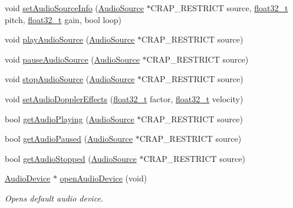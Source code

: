 \begin{DoxyCompactItemize}
\item 
void \hyperlink{namespacecrap_a4fd4860c7cb595ae4678703680d45f56}{set\+Audio\+Source\+Info} (\hyperlink{namespacecrap_a462d678db37c6a434145136ab6d59720}{Audio\+Source} $\ast$C\+R\+A\+P\+\_\+\+R\+E\+S\+T\+R\+I\+C\+T source, \hyperlink{crap__types_8h_a4611b605e45ab401f02cab15c5e38715}{float32\+\_\+t} pitch, \hyperlink{crap__types_8h_a4611b605e45ab401f02cab15c5e38715}{float32\+\_\+t} gain, bool loop)
\item 
void \hyperlink{namespacecrap_a4c9e443f838fdaa672cdac9a99c476c8}{play\+Audio\+Source} (\hyperlink{namespacecrap_a462d678db37c6a434145136ab6d59720}{Audio\+Source} $\ast$C\+R\+A\+P\+\_\+\+R\+E\+S\+T\+R\+I\+C\+T source)
\item 
void \hyperlink{namespacecrap_ae71e126c8b6319ea607fb4af874c15cf}{pause\+Audio\+Source} (\hyperlink{namespacecrap_a462d678db37c6a434145136ab6d59720}{Audio\+Source} $\ast$C\+R\+A\+P\+\_\+\+R\+E\+S\+T\+R\+I\+C\+T source)
\item 
void \hyperlink{namespacecrap_afe2ccaeafe2283bb11626085358de2ae}{stop\+Audio\+Source} (\hyperlink{namespacecrap_a462d678db37c6a434145136ab6d59720}{Audio\+Source} $\ast$C\+R\+A\+P\+\_\+\+R\+E\+S\+T\+R\+I\+C\+T source)
\item 
void \hyperlink{namespacecrap_abc5f005100a0bcf817e82185e209d517}{set\+Audio\+Doppler\+Effects} (\hyperlink{crap__types_8h_a4611b605e45ab401f02cab15c5e38715}{float32\+\_\+t} factor, \hyperlink{crap__types_8h_a4611b605e45ab401f02cab15c5e38715}{float32\+\_\+t} velocity)
\item 
bool \hyperlink{namespacecrap_ae366287c041ff6585d2ebde0ab651e9a}{get\+Audio\+Playing} (\hyperlink{namespacecrap_a462d678db37c6a434145136ab6d59720}{Audio\+Source} $\ast$C\+R\+A\+P\+\_\+\+R\+E\+S\+T\+R\+I\+C\+T source)
\item 
bool \hyperlink{namespacecrap_a72daa9c46c46112bc58eec039ccbe06b}{get\+Audio\+Paused} (\hyperlink{namespacecrap_a462d678db37c6a434145136ab6d59720}{Audio\+Source} $\ast$C\+R\+A\+P\+\_\+\+R\+E\+S\+T\+R\+I\+C\+T source)
\item 
bool \hyperlink{namespacecrap_aaad4e9a7f362dff5b1150fef391fcdea}{get\+Audio\+Stopped} (\hyperlink{namespacecrap_a462d678db37c6a434145136ab6d59720}{Audio\+Source} $\ast$C\+R\+A\+P\+\_\+\+R\+E\+S\+T\+R\+I\+C\+T source)
\item 
\hyperlink{namespacecrap_a0554191481198902f832204ecc2db4c0}{Audio\+Device} $\ast$ \hyperlink{namespacecrap_a39c24b21c6d1272568c835ac1a2a76f8}{open\+Audio\+Device} (void)
\begin{DoxyCompactList}\small\item\em Opens default audio device. \end{DoxyCompactList}\item 

\end{DoxyCompactItemize}
